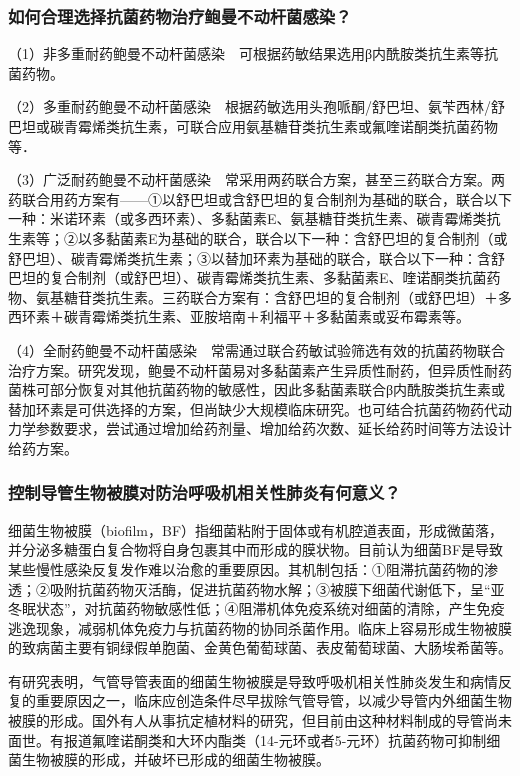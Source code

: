 \subsubsection{如何合理选择抗菌药物治疗鲍曼不动杆菌感染？}

（1）非多重耐药鲍曼不动杆菌感染　可根据药敏结果选用β内酰胺类抗生素等抗菌药物。

（2）多重耐药鲍曼不动杆菌感染　根据药敏选用头孢哌酮/舒巴坦、氨苄西林/舒巴坦或碳青霉烯类抗生素，可联合应用氨基糖苷类抗生素或氟喹诺酮类抗菌药物等．

（3）广泛耐药鲍曼不动杆菌感染　常采用两药联合方案，甚至三药联合方案。两药联合用药方案有------①以舒巴坦或含舒巴坦的复合制剂为基础的联合，联合以下一种：米诺环素（或多西环素）、多黏菌素E、氨基糖苷类抗生素、碳青霉烯类抗生素等；②以多黏菌素E为基础的联合，联合以下一种：含舒巴坦的复合制剂（或舒巴坦）、碳青霉烯类抗生素；③以替加环素为基础的联合，联合以下一种：含舒巴坦的复合制剂（或舒巴坦）、碳青霉烯类抗生素、多黏菌素E、喹诺酮类抗菌药物、氨基糖苷类抗生素。三药联合方案有：含舒巴坦的复合制剂（或舒巴坦）＋多西环素＋碳青霉烯类抗生素、亚胺培南＋利福平＋多黏菌素或妥布霉素等。

（4）全耐药鲍曼不动杆菌感染　常需通过联合药敏试验筛选有效的抗菌药物联合治疗方案。研究发现，鲍曼不动杆菌易对多黏菌素产生异质性耐药，但异质性耐药菌株可部分恢复对其他抗菌药物的敏感性，因此多黏菌素联合β内酰胺类抗生素或替加环素是可供选择的方案，但尚缺少大规模临床研究。也可结合抗菌药物药代动力学参数要求，尝试通过增加给药剂量、增加给药次数、延长给药时间等方法设计给药方案。

\subsubsection{控制导管生物被膜对防治呼吸机相关性肺炎有何意义？}

细菌生物被膜（biofilm，BF）指细菌粘附于固体或有机腔道表面，形成微菌落，并分泌多糖蛋白复合物将自身包裹其中而形成的膜状物。目前认为细菌BF是导致某些慢性感染反复发作难以治愈的重要原因。其机制包括：①阻滞抗菌药物的渗透；②吸附抗菌药物灭活酶，促进抗菌药物水解；③被膜下细菌代谢低下，呈“亚冬眠状态”，对抗菌药物敏感性低；④阻滞机体免疫系统对细菌的清除，产生免疫逃逸现象，减弱机体免疫力与抗菌药物的协同杀菌作用。临床上容易形成生物被膜的致病菌主要有铜绿假单胞菌、金黄色葡萄球菌、表皮葡萄球菌、大肠埃希菌等。

有研究表明，气管导管表面的细菌生物被膜是导致呼吸机相关性肺炎发生和病情反复的重要原因之一，临床应创造条件尽早拔除气管导管，以减少导管内外细菌生物被膜的形成。国外有人从事抗定植材料的研究，但目前由这种材料制成的导管尚未面世。有报道氟喹诺酮类和大环内酯类（14-元环或者5-元环）抗菌药物可抑制细菌生物被膜的形成，并破坏已形成的细菌生物被膜。

